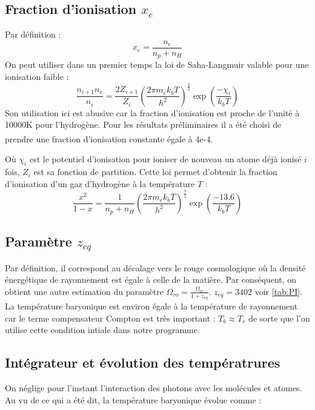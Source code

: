 \documentclass[10pt, a4paper]{report}
\numberwithin{equation}{subsection}
\begin{document}
\subsection{Fraction d'ionisation $x_e$}
Par définition :
\begin{equation} \label{eq:XE}
\boxed{x_e= \frac{n_e}{n_p+n_H}}
\end{equation}
On peut utiliser dans un premier temps la loi de Saha-Langmuir valable pour une ionisation faible :
\begin{equation} \label{eq:XESL}
\boxed{\frac{n_{i+1} n_e }{n_i} = \frac{2 Z_{i+1}}{Z_i} \left( \frac{2\pi m_ek_bT}{h^2}\right)^{\frac{3}{2}} \exp(\frac{-\chi_i}{k_bT})}
\end{equation}
Son utilisation ici est abusive car la fraction d'ionisation est proche de l'unité à 10000K pour l'hydrogène. Pour les résultats préliminaires il a été choisi de prendre une fraction d'ionisation constante égale à 4e-4\textsuperscript{\cite{Flower}}.

Où $\chi_i$ est le potentiel d'ionisation pour ioniser de nouveau un atome déjà ionisé $i$ fois, $Z_i$ est sa fonction de partition. Cette loi permet d'obtenir la fraction d'ionisation d'un gaz d'hydrogène à la température $T$ :
\begin{equation} \label{eq:XE}
\boxed{\frac{x^2}{1-x} = \frac{1}{n_p+n_H} \left( \frac{2\pi m_ek_bT}{h^2}\right)^{\frac{3}{2}} \exp(\frac{-13.6}{k_bT})}
\end{equation}

\subsection{Paramètre $z_{eq}$}
Par définition, il correspond au décalage vers le rouge cosmologique où la densité énergétique de rayonnement est égale à celle de la matière. Par conséquent, on obtient une autre estimation du paramètre $\Omega_{ro} = \frac{\Omega_{m}}{1+z_{eq}}$. $z_{eq} = 3402$ voir \ref{tab:PI}. La température baryonique est environ égale à la température de rayonnement car le terme compensateur Compton est très important : $T_b \approx T_r$ de sorte que l'on utilise cette condition intiale dans notre programme.

\subsection{Intégrateur et évolution des températrures}\label{IEEDT}
On néglige pour l'instant l'interaction des photons avec les molécules et atomes. Au vu de ce qui a été dit, la température baryonique évolue comme :
\end{document}
